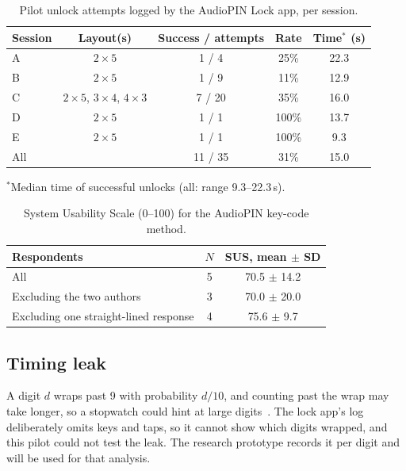\documentclass[conference]{IEEEtran}
\begin{document}
\begin{table}[t]
\centering
\caption{Pilot unlock attempts logged by the AudioPIN Lock app, per session.}
\label{tab:study}
\setlength{\tabcolsep}{4pt}
\begin{tabular}{lcccc}
\toprule
Session & Layout(s) & Success / attempts & Rate & Time$^{*}$ (s) \\
\midrule
A & $2\times5$                  & 1 / 4   & 25\%  & 22.3 \\
B & $2\times5$                  & 1 / 9   & 11\%  & 12.9 \\
C & $2\times5$, $3\times4$, $4\times3$ & 7 / 20  & 35\%  & 16.0 \\
D & $2\times5$                  & 1 / 1   & 100\% & 13.7 \\
E & $2\times5$                  & 1 / 1   & 100\% & 9.3 \\
\midrule
All &                           & 11 / 35 & 31\%  & 15.0 \\
\bottomrule
\end{tabular}

\vspace{2pt}
{\footnotesize $^{*}$Median time of successful unlocks (all: range 9.3--22.3\,s).}
\end{table}

\begin{table}[t]
\centering
\caption{System Usability Scale (0--100) for the AudioPIN key-code method.}
\label{tab:sus}
\begin{tabular}{lcc}
\toprule
Respondents & $N$ & SUS, mean $\pm$ SD \\
\midrule
All                          & 5 & 70.5 $\pm$ 14.2 \\
Excluding the two authors    & 3 & 70.0 $\pm$ 20.0 \\
Excluding one straight-lined response & 4 & 75.6 $\pm$ 9.7 \\
\bottomrule
\end{tabular}
\end{table}

\subsection{Timing leak}
A digit $d$ wraps past 9 with probability $d/10$, and counting past the wrap may take longer, so a
stopwatch could hint at large digits~\cite{perkovic2010partially}. The lock app's log deliberately omits
keys and taps, so it cannot show which digits wrapped, and this pilot could not test the leak. The
research prototype records it per digit and will be used for that analysis.
\end{document}
